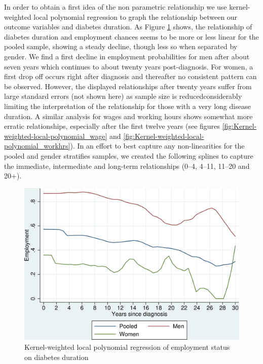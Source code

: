 \documentclass[12pt,english,british]{article}
\providecommand{\DIFaddtex}[1]{{\protect\color{blue}\uwave{#1}}} %
\providecommand{\DIFaddbegin}{} %
\providecommand{\DIFaddend}{} %
\providecommand{\DIFadd}[1]{\texorpdfstring{\DIFaddtex{#1}}{#1}} %
\begin{document}
In order to obtain a first idea of the non parametric relationship
we use kernel-weighted local polynomial regression to graph the relationship
between our outcome variables and diabetes duration. As Figure \ref{fig:Kernel-weighted-local-polynomial_empl}
shows, the relationship of diabetes duration and employment chances
seems to be more or less linear for the pooled sample, showing a steady
decline, though less so when separated by gender. We find a first
decline in employment probabilities for men after about seven years
which continues to about twenty years post-diagnosis. For women,
a first drop off occurs right after diagnosis and thereafter no consistent
pattern can be observed. However, the displayed relationships after
twenty years suffer from large standard errors (not shown here) as sample size is reduced\DIFaddbegin \DIFadd{,
}\DIFaddend considerably limiting the interpretation of the relationship for those with a very long disease duration. A similar analysis for wages and working hours shows
somewhat more erratic relationships, especially after the first twelve
years (see figures \ref{fig:Kernel-weighted-local-polynomial_wage} and \ref{fig:Kernel-weighted-local-polynomial_workhrs}). In an effort to best capture any non-linearities for the pooled
and gender stratifies samples, we created the following splines to
capture the immediate, intermediate and long-term relationships (0--4,
4--11, 11--20 and 20+).   


\begin{figure}[h!]
\caption{\label{fig:Kernel-weighted-local-polynomial_empl}Kernel-weighted local
polynomial regression of employment status on diabetes duration}%
\begin{center}
\includegraphics[width=0.7\columnwidth]{figures/lpoly_works_diabetesduration/lpoly_works_diabetesduration}
\end{center}
\end{figure}
\end{document}
